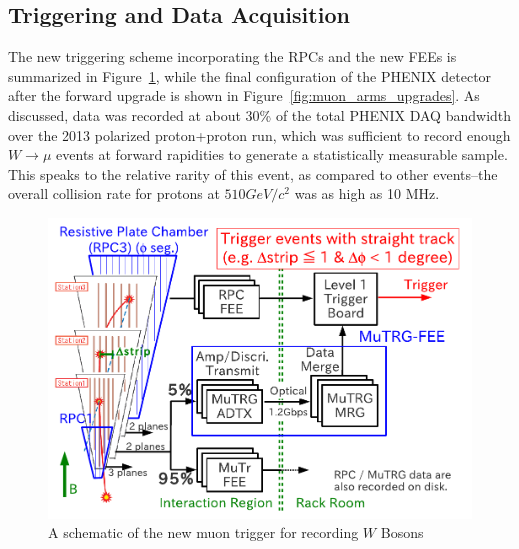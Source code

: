 \subsection{Triggering and Data Acquisition}
\label{sec:triggering_aquisition}

The new triggering scheme incorporating the RPCs and the new FEEs is summarized
in Figure~\ref{fig:new_muon_trigger}, while the final configuration of the
PHENIX detector after the forward upgrade is shown in
Figure~\ref{fig:muon_arms_upgrades}. As discussed, data was recorded at about
30\% of the total PHENIX DAQ bandwidth over the 2013 polarized proton+proton
run, which was sufficient to record enough $W\rightarrow\mu$ events at forward
rapidities to generate a statistically measurable sample. This speaks to the
relative rarity of this event, as compared to other events--the overall
collision rate for protons at $510 GeV/c^2$ was as high as 10 MHz.

\begin{figure}[ht]
  \centering
  \includegraphics[width=0.8\linewidth]{./figures/new_muon_trigger.png}
  \caption{
    A schematic of the new muon trigger for recording
    $W$ Bosons~\cite{Fukao2011}
  }
  \label{fig:new_muon_trigger}
\end{figure}

